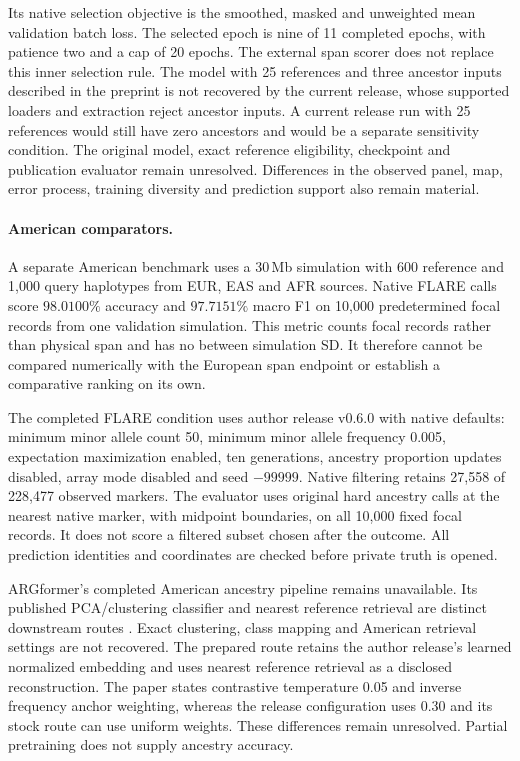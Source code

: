 \documentclass[letterpaper]{article}
\begin{document}
Its native selection objective is the smoothed, masked and unweighted mean validation batch loss. The selected epoch is nine of 11 completed epochs, with patience two and a cap of 20 epochs. The external span scorer does not replace this inner selection rule. The model with 25 references and three ancestor inputs described in the preprint is not recovered by the current release, whose supported loaders and extraction reject ancestor inputs. A current release run with 25 references would still have zero ancestors and would be a separate sensitivity condition. The original model, exact reference eligibility, checkpoint and publication evaluator remain unresolved. Differences in the observed panel, map, error process, training diversity and prediction support also remain material.

\paragraph{American comparators.}
A separate American benchmark uses a 30\,Mb simulation with 600 reference and 1,000 query haplotypes from EUR, EAS and AFR sources. Native FLARE calls score $98.0100\%$ accuracy and $97.7151\%$ macro F1 on 10,000 predetermined focal records from one validation simulation. This metric counts focal records rather than physical span and has no between simulation SD. It therefore cannot be compared numerically with the European span endpoint or establish a comparative ranking on its own.

The completed FLARE condition uses author release v0.6.0 with native defaults: minimum minor allele count 50, minimum minor allele frequency 0.005, expectation maximization enabled, ten generations, ancestry proportion updates disabled, array mode disabled and seed $-99999$. Native filtering retains 27,558 of 228,477 observed markers. The evaluator uses original hard ancestry calls at the nearest native marker, with midpoint boundaries, on all 10,000 fixed focal records. It does not score a filtered subset chosen after the outcome. All prediction identities and coordinates are checked before private truth is opened. 

ARGformer's completed American ancestry pipeline remains unavailable. Its published PCA/clustering classifier and nearest reference retrieval are distinct downstream routes \citep{argformer2026}. Exact clustering, class mapping and American retrieval settings are not recovered. The prepared route retains the author release's learned normalized embedding and uses nearest reference retrieval as a disclosed reconstruction. The paper states contrastive temperature 0.05 and inverse frequency anchor weighting, whereas the release configuration uses 0.30 and its stock route can use uniform weights. These differences remain unresolved. Partial pretraining does not supply ancestry accuracy.
\end{document}
